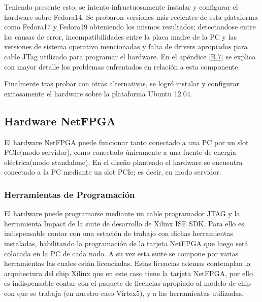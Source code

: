 Teniendo presente esto, se intento infructuosamente instalar y configurar el hardware sobre Fedora14. Se probaron versiones m\'as recientes de esta plataforma como Fedora17 y Fedora19 obteniendo los mismos resultados; detectandose entre las causas de error, incompatibilidades entre la placa madre de la PC y las versiones de sistema operativo mencionadas y falta de drivers apropiados para cable JTag utilizado para programar el hardware. En el apéndice \ref{B.7} se explica con mayor detalle los problemas enfrentados en relaci\'on a esta componente.

Finalmente tras probar con otras alternativas, se logr\'o instalar y configurar exitosamente el hardware sobre la plataforma Ubuntu 12.04.

\subsection{Hardware NetFPGA}

El hardware NetFPGA puede funcionar tanto conectado a una PC por un slot PCIe(modo servidor), como conectado \'unicamente a una fuente de energ\'ia el\'ectrica(modo standalone). En el dise\~no planteado el hardware se encuentra conectado a la PC mediante un slot PCIe; es decir, en modo servidor.


\subsubsection{Herramientas de Programaci\'on}

El hardware puede programarse mediante un cable programador JTAG y la herramienta Impact de la suite de desarrollo de Xilinx ISE SDK. Para ello es indispensable contar con una estaci\'on de trabajo con dichas herramientas instaladas, habilitando la programaci\'on  de la tarjeta NetFPGA que luego ser\'a colocada en la PC de cada nodo. A su vez esta suite se compone por varias herramientas las cuales están licenciadas. Estas licencias ademas contemplan la arquitectura del chip Xilinx que en este caso tiene la tarjeta NetFPGA, por ello es indispensable contar con el paquete de licencias apropiado al modelo de chip con que se trabaja (en nuestro caso Virtex5), y a las herramientas utilizadas. 

